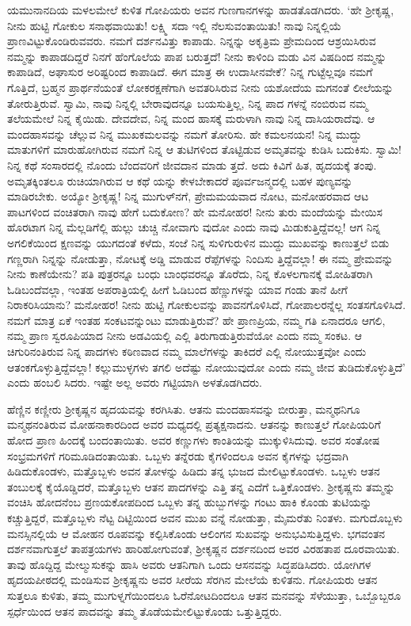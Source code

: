 ಯಮುನಾನದಿಯ ಮಳಲಮೇಲೆ ಕುಳಿತ ಗೋಪಿಯರು ಅವನ ಗುಣಗಾನಗಳನ್ನು ಹಾಡತೊಡಗಿದರು. ‘ಹೇ ಶ್ರೀಕೃಷ್ಣ, ನೀನು ಹುಟ್ಟಿ ಗೋಕುಲ ಸನಾಥವಾಯಿತು! ಲಕ್ಷ್ಮಿ ಸದಾ ಇಲ್ಲಿ ನೆಲಸುವಂತಾಯಿತು! ನಾವು ನಿನ್ನಲ್ಲಿಯೆ ಪ್ರಾಣವಿಟ್ಟುಕೊಂಡಿರುವವರು. ನಮಗೆ ದರ್ಶನವಿತ್ತು ಕಾಪಾಡು. ನಿನ್ನನ್ನು ಅಕೃತ್ರಿಮ ಪ್ರೇಮದಿಂದ ಆಶ್ರಯಿಸಿರುವ ನಮ್ಮನ್ನು ಕಾಪಾಡದಿದ್ದರೆ ನಿನಗೆ ಹೆಂಗೊಲೆಯ ಪಾಪ ಬರುತ್ತದೆ! ನೀನು ಕಾಳಿಂದಿ ಮಡು ವಿನ ವಿಷದಿಂದ ನಮ್ಮನ್ನು ಕಾಪಾಡಿದೆ, ಅಘಾಸುರ ಅರಿಷ್ಟರಿಂದ ಕಾಪಾಡಿದೆ. ಈಗ ಮಾತ್ರ ಈ ಉದಾಸೀನವೇಕೆ? ನಿನ್ನ ಗುಟ್ಟೆಲ್ಲವೂ ನಮಗೆ ಗೊತ್ತಿದೆ, ಬ್ರಹ್ಮನ ಪ್ರಾರ್ಥನೆಯಂತೆ ಲೋಕರಕ್ಷಣೆಗಾಗಿ ಅವತರಿಸಿರುವ ನೀನು ಯಶೋದೆಯ ಮಗನಂತೆ ಲೀಲೆಯನ್ನು ತೋರುತ್ತಿರುವೆ. ಸ್ವಾಮಿ, ನಾವು ನಿನ್ನಲ್ಲಿ ಬೇರಾವುದನ್ನೂ ಬಯಸುತ್ತಿಲ್ಲ, ನಿನ್ನ ಪಾದ ಗಳನ್ನೆ ನಂಬಿರುವ ನಮ್ಮ ತಲೆಯಮೇಲೆ ನಿನ್ನ ಕೈಯಿಡು. ದೇವದೇವ, ನಿನ್ನ ಮಂದ ಹಾಸಕ್ಕೆ ಮರುಳಾಗಿ ನಾವು ನಿನ್ನ ದಾಸಿಯರಾದೆವು. ಆ ಮಂದಹಾಸವನ್ನು ಚೆಲ್ಲುವ ನಿನ್ನ ಮುಖಕಮಲವನ್ನು ನಮಗೆ ತೋರಿಸು. ಹೇ ಕಮಲನಯನ! ನಿನ್ನ ಮುದ್ದು ಮಾತುಗಳಿಗೆ ಮಾರುಹೋಗಿರುವ ನಮಗೆ ನಿನ್ನ ಆ ತುಟಿಗಳಿಂದ ತೊಟ್ಟಿಡುವ ಅಮೃತವನ್ನು ಕುಡಿಸಿ ಬದುಕಿಸು. ಸ್ವಾಮಿ! ನಿನ್ನ ಕಥೆ ಸಂಸಾರದಲ್ಲಿ ನೊಂದು ಬೆಂದವರಿಗೆ ಜೀವದಾನ ಮಾಡು ತ್ತದೆ. ಅದು ಕಿವಿಗೆ ಹಿತ, ಹೃದಯಕ್ಕೆ ತಂಪು. ಅಮೃತಕ್ಕಿಂತಲೂ ರುಚಿಯಾಗಿರುವ ಆ ಕಥೆ ಯನ್ನು ಕೇಳಬೇಕಾದರೆ ಪೂರ್ವಜನ್ಮದಲ್ಲಿ ಬಹಳ ಪುಣ್ಯವನ್ನು ಮಾಡಿರಬೇಕು. ಅಯ್ಯೋ ಶ್ರೀಕೃಷ್ಣ! ನಿನ್ನ ಮುಗುಳ್​ನಗೆ, ಪ್ರೇಮಮಯವಾದ ನೋಟ, ಮನೋಹರವಾದ ಆಟ ಪಾಟಗಳಿಂದ ವಂಚಿತರಾಗಿ ನಾವು ಹೇಗೆ ಬದುಕೋಣ? ಹೇ ಮನೋಹರ! ನೀನು ತುರು ಮಂದೆಯನ್ನು ಮೇಯಿಸ ಹೊರಟಾಗ ನಿನ್ನ ಮೆಲ್ಲಡಿಗೆಲ್ಲಿ ಹುಲ್ಲು ಚುಚ್ಚಿ ನೋವಾಗು ವುದೋ ಎಂದು ನಾವು ಮಿಡುಕುತ್ತಿದ್ದೆವಲ್ಲ! ಆಗ ನಿನ್ನ ಅಗಲಿಕೆಯಿಂದ ಕ್ಷಣವನ್ನು ಯುಗದಂತೆ ಕಳೆದು, ಸಂಜೆ ನಿನ್ನ ಸುಳಿಗುರುಳಿನ ಮುದ್ದು ಮುಖವನ್ನು ಕಾಣುತ್ತಲೆ ಬಿಡು ಗಣ್ಣರಾಗಿ ನಿನ್ನನ್ನು ನೋಡುತ್ತಾ, ನೋಟಕ್ಕೆ ಅಡ್ಡಿ ಮಾಡುವ ರೆಪ್ಪೆಗಳನ್ನು ನಿಂದಿಸು ತ್ತಿದ್ದೆವಲ್ಲಾ! ಈ ನಮ್ಮ ಪ್ರೇಮವನ್ನು ನೀನು ಕಾಣೆಯೇನು? ಪತಿ ಪುತ್ರರನ್ನೂ ಬಂಧು ಬಾಂಧವರನ್ನೂ ತೊರೆದು, ನಿನ್ನ ಕೊಳಲಗಾನಕ್ಕೆ ಮೋಹಿತರಾಗಿ ಓಡಿಬಂದೆವಲ್ಲಾ, ಇಂತಹ ಅಪರಾತ್ರಿಯಲ್ಲಿ ಹೀಗೆ ಓಡಿಬಂದ ಹೆಣ್ಣುಗಳನ್ನು ಯಾವ ಗಂಡು ತಾನೆ ಹೀಗೆ ನಿರಾಕರಿಸಿಯಾನು? ಮನೋಹರ! ನೀನು ಹುಟ್ಟಿ ಗೋಕುಲವನ್ನು ಪಾವನಗೊಳಿಸಿದೆ, ಗೋಪಾಲರನ್ನೆಲ್ಲ ಸಂತಸಗೊಳಿಸಿದೆ. ನಮಗೆ ಮಾತ್ರ ಏಕೆ ಇಂತಹ ಸಂಕಟವನ್ನುಂಟು ಮಾಡುತ್ತಿರುವೆ? ಹೇ ಪ್ರಾಣಪ್ರಿಯ, ನಮ್ಮ ಗತಿ ಏನಾದರೂ ಆಗಲಿ, ನಮ್ಮ ಪ್ರಾಣ ಸ್ವರೂಪಿಯಾದ ನೀನು ಅಡವಿಯಲ್ಲಿ ಎಲ್ಲಿ ತಿರುಗಾಡುತ್ತಿರುವೆಯೋ ಎಂದು ನಮ್ಮ ಸಂಕಟ. ಆ ಚಿಗುರಿನಂತಿರುವ ನಿನ್ನ ಪಾದಗಳು ಕಠಿಣವಾದ ನಮ್ಮ ಮಾಲೆಗಳನ್ನು ತಾಕಿದರೆ ಎಲ್ಲಿ ನೋಯುತ್ತವೋ ಎಂದು ಆತಂಕಗೊಳ್ಳುತ್ತಿದ್ದೆವಲ್ಲಾ! ಕಲ್ಲುಮುಳ್ಳಗಳು ತಗಲಿ ಅದೆಷ್ಟು ನೋಯುವುದೋ ಎಂದು ನಮ್ಮ ಜೀವ ತುಡಿದುಕೊಳ್ಳುತ್ತಿದೆ’ ಎಂದು ಹಂಬಲಿ ಸಿದರು. ಇಷ್ಟೇ ಅಲ್ಲ ಅವರು ಗಟ್ಟಿಯಾಗಿ ಅಳತೊಡಗಿದರು.

ಹೆಣ್ಣಿನ ಕಣ್ಣೀರು ಶ್ರೀಕೃಷ್ಣನ ಹೃದಯವನ್ನು ಕರಗಿಸಿತು. ಆತನು ಮಂದಹಾಸವನ್ನು ಬೀರುತ್ತಾ, ಮನ್ಮಥನಿಗೂ ಮನ್ಮಥನಂತಿರುವ ಮೋಹನಾಕಾರದಿಂದ ಅವರ ಮಧ್ಯದಲ್ಲಿ ಪ್ರತ್ಯಕ್ಷನಾದನು. ಆತನನ್ನು ಕಾಣುತ್ತಲೆ ಗೋಪಿಯರಿಗೆ ಹೋದ ಪ್ರಾಣ ಹಿಂದಕ್ಕೆ ಬಂದಂತಾಯಿತು. ಅವರ ಕಣ್ಣುಗಳು ಕಾಂತಿಯನ್ನು ಮುಕ್ಕುಳಿಸಿದುವು. ಅವರ ಸಂತೋಷ ಸಂಭ್ರಮಗಳಿಗೆ ಗರಿಮೂಡಿದಂತಾಯಿತು. ಒಬ್ಬಳು ತನ್ನೆರಡು ಕೈಗಳಿಂದಲೂ ಅವನ ಕೈಗಳನ್ನು ಭದ್ರವಾಗಿ ಹಿಡಿದುಕೊಂಡಳು, ಮತ್ತೊಬ್ಬಳು ಅವನ ತೋಳನ್ನು ಹಿಡಿದು ತನ್ನ ಭುಜದ ಮೇಲಿಟ್ಟುಕೊಂಡಳು. ಒಬ್ಬಳು ಆತನ ತಂಬುಲಕ್ಕೆ ಕೈಯೊಡ್ಡಿದರೆ, ಮತ್ತೊಬ್ಬಳು ಆತನ ಪಾದಗಳನ್ನು ಎತ್ತಿ ತನ್ನ ಎದೆಗೆ ಒತ್ತಿಕೊಂಡಳು. ಶ್ರೀಕೃಷ್ಣನು ತಮ್ಮನ್ನು ವಂಚಿಸಿ ಹೋದನೆಂಬ ಪ್ರಣಯಕೋಪದಿಂದ ಒಬ್ಬಳು ತನ್ನ ಹುಬ್ಬುಗಳನ್ನು ಗಂಟು ಹಾಕಿ ಕೊಂಡು ತುಟಿಯನ್ನು ಕಚ್ಚುತ್ತಿದ್ದರೆ, ಮತ್ತೊಬ್ಬಳು ನೆಟ್ಟ ದಿಟ್ಟಿಯಿಂದ ಅವನ ಮುಖ ವನ್ನೆ ನೋಡುತ್ತಾ, ಮೈಮರೆತು ನಿಂತಳು. ಮಗುದೊಬ್ಬಳು ಮನಸ್ಸಿನಲ್ಲಿಯೆ ಆ ಮೋಹನ ರೂಪವನ್ನು ಕಲ್ಪಿಸಿಕೊಂಡು ಆಲಿಂಗನ ಸುಖವನ್ನು ಅನುಭವಿಸುತ್ತಿದ್ದಳು. ಭಗವಂತನ ದರ್ಶನವಾಗುತ್ತಲೆ ತಾಪತ್ರಯಗಳು ಹಾರಿಹೋಗುವಂತೆ, ಶ್ರೀಕೃಷ್ಣನ ದರ್ಶನದಿಂದ ಅವರ ವಿರಹತಾಪ ದೂರವಾಯಿತು. ತಾವು ಹೊದ್ದಿದ್ದ ಮೇಲ್ಮುಸುಕನ್ನು ಹಾಸಿ ಅವರು ಆತನಿಗಾಗಿ ಒಂದು ಆಸನವನ್ನು ಸಿದ್ಧಪಡಿಸಿದರು. ಯೋಗಿಗಳ ಹೃದಯಪೀಠದಲ್ಲಿ ಮಂಡಿಸುವ ಶ್ರೀಕೃಷ್ಣನು ಅವರ ಸೀರೆಯ ಸೆರಗಿನ ಮೇಲೆಯೆ ಕುಳಿತನು. ಗೋಪಿಯರು ಆತನ ಸುತ್ತಲೂ ಕುಳಿತು, ತಮ್ಮ ಮುಗುಳ್ನಗೆಯಿಂದಲೂ ಓರೆನೋಟದಿಂದಲೂ ಆತನ ಮನವನ್ನು ಸೆಳೆಯುತ್ತಾ, ಒಬ್ಬೊಬ್ಬರೂ ಸ್ಪರ್ಧೆಯಿಂದ ಆತನ ಪಾದವನ್ನು ತಮ್ಮ ತೊಡೆಯಮೇಲಿಟ್ಟುಕೊಂಡು ಒತ್ತುತ್ತಿದ್ದರು.

